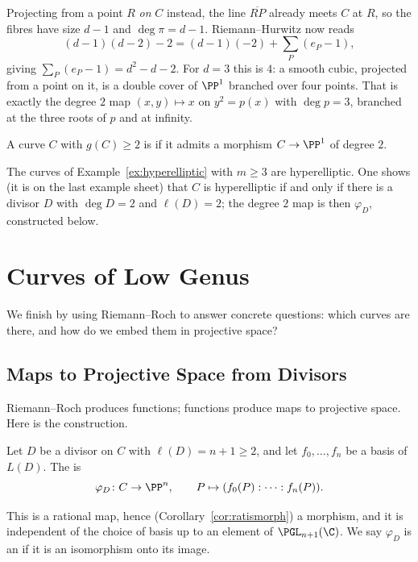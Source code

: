 \begin{example}
	Projecting from a point $R$ \emph{on} $C$ instead, the line $\overline{RP}$ already meets $C$ at $R$, so the fibres have size $d-1$ and $\deg\pi = d-1$. Riemann--Hurwitz now reads
	$$(d-1)(d-2)-2 = (d-1)(-2) + \sum_P(e_P-1),$$
	giving $\sum_P(e_P-1) = d^2 - d - 2$. For $d = 3$ this is $4$: a smooth cubic, projected from a point on it, is a double cover of $\PP^1$ branched over four points. That is exactly the degree $2$ map $(x,y)\mapsto x$ on $y^2 = p(x)$ with $\deg p = 3$, branched at the three roots of $p$ and at infinity.
\end{example}

\begin{definition}
	A curve $C$ with $g(C)\geq 2$ is  if it admits a morphism $C \to \PP^1$ of degree $2$.
\end{definition}

The curves of Example~\ref{ex:hyperelliptic} with $m \geq 3$ are hyperelliptic. One shows (it is on the last example sheet) that $C$ is hyperelliptic if and only if there is a divisor $D$ with $\deg D = 2$ and $\ell(D) = 2$; the degree $2$ map is then $\varphi_D$, constructed below.

\section{Curves of Low Genus}\label{sec:lowgenus}

We finish by using Riemann--Roch to answer concrete questions: which curves are there, and how do we embed them in projective space?

\subsection{Maps to Projective Space from Divisors}

Riemann--Roch produces functions; functions produce maps to projective space. Here is the construction.

\begin{definition}
	Let $D$ be a divisor on $C$ with $\ell(D) = n+1 \geq 2$, and let $f_0,\dots,f_n$ be a basis of $L(D)$. The  is
	$$\varphi_D \colon C \to \PP^n, \qquad P \mapsto (f_0(P) : \cdots : f_n(P)).$$
\end{definition}

This is a rational map, hence (Corollary~\ref{cor:ratismorph}) a morphism, and it is independent of the choice of basis up to an element of $\PGL_{n+1}(\C)$. We say $\varphi_D$ is an  if it is an isomorphism onto its image.

